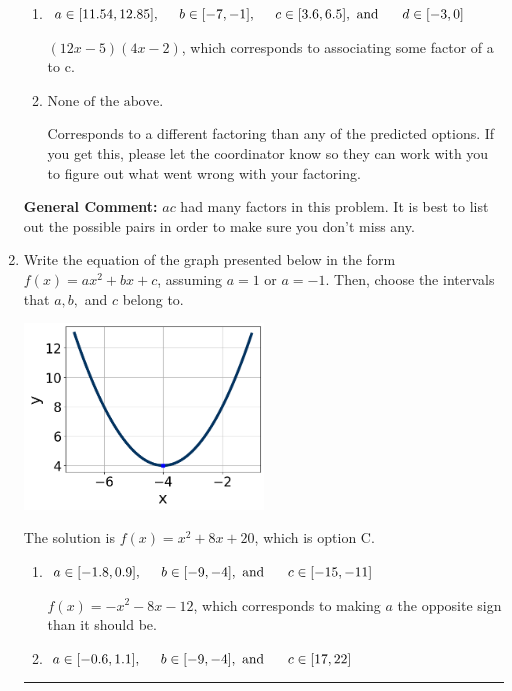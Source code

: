 \documentclass{extbook}[14pt]
\newcommand{\litem}[1]{\item #1

\rule{\textwidth}{0.4pt}}
\begin{document}
\begin{enumerate}
{\begin{enumerate}[label=\Alph*.]
* $(6x -5)(9x -2)$, which is the correct option.
\item \( a \in [11.54, 12.85], \hspace*{5mm} b \in [-7, -1], \hspace*{5mm} c \in [3.6, 6.5], \text{ and } \hspace*{5mm} d \in [-3, 0] \)

 $(12x -5)(4x -2)$, which corresponds to associating some factor of a to c.
\item \( \text{None of the above.} \)

 Corresponds to a different factoring than any of the predicted options. If you get this, please let the coordinator know so they can work with you to figure out what went wrong with your factoring.
\end{enumerate}

\textbf{General Comment:} $ac$ had many factors in this problem. It is best to list out the possible pairs in order to make sure you don't miss any.
}
\litem{
Write the equation of the graph presented below in the form $f(x)=ax^2+bx+c$, assuming  $a=1$ or $a=-1$. Then, choose the intervals that $a, b,$ and $c$ belong to.

\begin{center}
    \includegraphics[width=0.5\textwidth]{../Figures/quadraticGraphToEquationCopyC.png}
\end{center}


The solution is \( f(x) = x^{2} +8 x + 20 \), which is option C.\begin{enumerate}[label=\Alph*.]
\item \( a \in [-1.8, 0.9], \hspace*{5mm} b \in [-9, -4], \text{ and } \hspace*{5mm} c \in [-15, -11] \)

$f(x)=-x^{2} -8 x -12$, which corresponds to making $a$ the opposite sign than it should be.
\item \( a \in [-0.6, 1.1], \hspace*{5mm} b \in [-9, -4], \text{ and } \hspace*{5mm} c \in [17, 22] \)


\end{enumerate}}
\end{enumerate}
\end{document}

